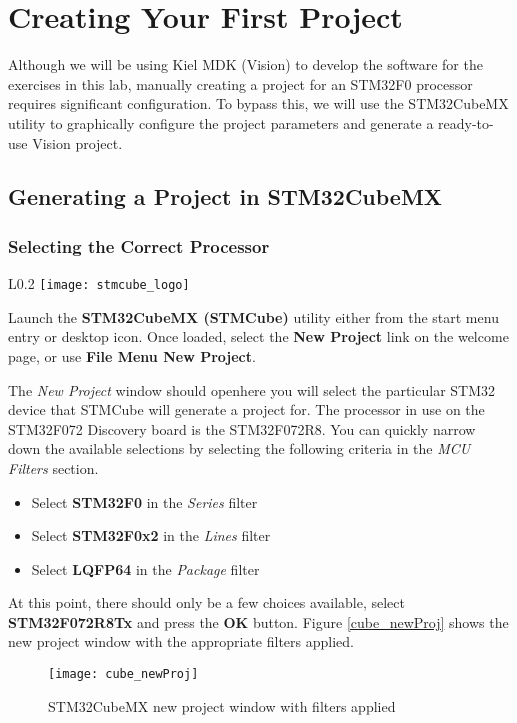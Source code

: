 \documentclass[11pt,fleqn]{book} %
\begin{document}
\section{Creating Your First Project}
Although we will be using Kiel MDK ({\textmu}Vision) to develop the software for the exercises in this lab, manually creating a project for an STM32F0 processor requires significant configuration. To bypass this, we will use the STM32CubeMX utility to graphically configure the project parameters and generate a ready-to-use {\textmu}Vision project. 

\subsection{Generating a Project in STM32CubeMX}
\subsubsection*{Selecting the Correct Processor}
\begin{wrapfigure}{L}{0.2\textwidth}
	\centering\texttt{[image: stmcube\_logo]}
\end{wrapfigure}

Launch the \textbf{STM32CubeMX (STMCube)} utility either from the start menu entry or desktop icon. Once loaded, select the \textbf{New Project} link on the welcome page, or use \textbf{File Menu \textrightarrow New Project}.

\noindent
The \textit{New Project} window should open\textemdash here you will select the particular STM32 device that STMCube will generate a project for. The processor in use on the STM32F072 Discovery board is the STM32F072R8. You can quickly narrow down the available selections by selecting the following criteria in the \textit{MCU Filters} section.
\begin{itemize}
	\item Select \textbf{STM32F0} in the \textit{Series} filter
	\item Select \textbf{STM32F0x2} in the \textit{Lines} filter
	\item Select \textbf{LQFP64} in the \textit{Package} filter
\end{itemize}
At this point, there should only be a few choices available, select \textbf{STM32F072R8Tx} and press the \textbf{OK} button. Figure \vref{cube_newProj} shows the new project window with the appropriate filters applied.

\begin{figure}[h]
	\centering\texttt{[image: cube\_newProj]}
	\caption{STM32CubeMX new project window with filters applied}
	\label{cube_newProj}
\end{figure}
\end{document}
